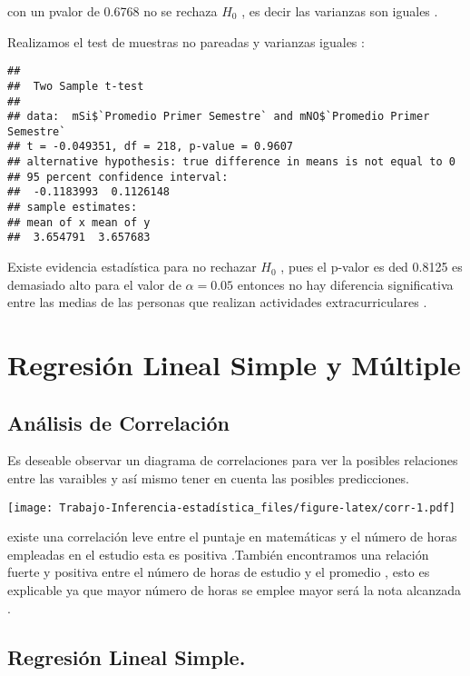 \documentclass[
  man]{apa6}
\begin{document}
con un pvalor de 0.6768 no se rechaza \(H_0\) , es decir las varianzas son
iguales .

\clearpage

Realizamos el test de muestras no pareadas y varianzas iguales :

\begin{verbatim}
## 
##  Two Sample t-test
## 
## data:  mSi$`Promedio Primer Semestre` and mNO$`Promedio Primer Semestre`
## t = -0.049351, df = 218, p-value = 0.9607
## alternative hypothesis: true difference in means is not equal to 0
## 95 percent confidence interval:
##  -0.1183993  0.1126148
## sample estimates:
## mean of x mean of y 
##  3.654791  3.657683
\end{verbatim}

Existe evidencia estadística para no rechazar \(H_0\) , pues el p-valor es
ded 0.8125 es demasiado alto para el valor de \(\alpha=0.05\) entonces no
hay diferencia significativa entre las medias de las personas que
realizan actividades extracurriculares .

\newpage

\hypertarget{regresiuxf3n-lineal-simple-y-muxfaltiple}{%
\section{Regresión Lineal Simple y Múltiple}\label{regresiuxf3n-lineal-simple-y-muxfaltiple}}

\hypertarget{anuxe1lisis-de-correlaciuxf3n}{%
\subsection{Análisis de Correlación}\label{anuxe1lisis-de-correlaciuxf3n}}

Es deseable observar un diagrama de correlaciones para ver la posibles
relaciones entre las varaibles y así mismo tener en cuenta las posibles
predicciones.

\texttt{[image: Trabajo-Inferencia-estadística\_files/figure-latex/corr-1.pdf]}

existe una correlación leve entre el puntaje en matemáticas y el número
de horas empleadas en el estudio esta es positiva .También encontramos
una relación fuerte y positiva entre el número de horas de estudio y el
promedio , esto es explicable ya que mayor número de horas se emplee
mayor será la nota alcanzada . \clearpage

\hypertarget{regresiuxf3n-lineal-simple.}{%
\subsection{Regresión Lineal Simple.}\label{regresiuxf3n-lineal-simple.}}
\end{document}
